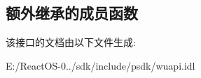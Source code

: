 \subsection*{额外继承的成员函数}


该接口的文档由以下文件生成\+:\begin{DoxyCompactItemize}
\item 
E\+:/\+React\+O\+S-\/0../sdk/include/psdk/wuapi.\+idl\end{DoxyCompactItemize}
